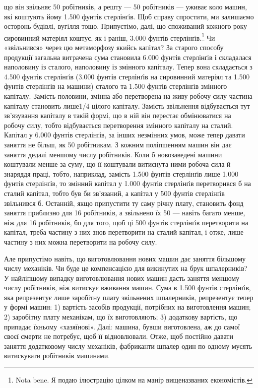 \parcont{}  %
що він звільняє 50 робітників, а решту — 50 робітників — уживає
коло машин, які коштують йому 1.500 фунтів стерлінґів. Щоб
справу спростити, ми залишаємо осторонь будівлі, вугілля тощо.
Припустімо, далі, що споживаний кожного року сировинний
матеріял коштує, як і раніш, 3.000 фунтів стерлінґів.\footnote{
Nota bene. Я подаю ілюстрацію цілком на манір вищеназваних
економістів.
} Чи
«звільнився» через цю метаморфозу якийсь капітал? За старого
способу продукції загальна витрачена сума становила 6.000 фунтів
стерлінґів і складалася наполовину із сталого, наполовину із
змінного капіталу. Тепер вона складається з 4.500 фунтів стерлінґів
(3.000 фунтів стерлінґів на сировинний матеріял та 1.500 фунтів
стерлінґів на машини) сталого та 1.500 фунтів стерлінґів змінного
капіталу. Замість половини, змінна або перетворена на живу робочу
силу частина капіталу становить лише1/4 цілого капіталу. Замість
звільнення відбувається тут зв’язування капіталу в такій формі,
що в ній він перестає обмінюватися на робочу силу, тобто відбувається
перетворення змінного капіталу на сталий. Капітал у 6.000
фунтів стерлінґів, за інших незмінних умов, може тепер давати заняття
не більш, як 50 робітникам. З кожним поліпшенням машин він
дає заняття дедалі меншому числу робітників. Коли б новозаведені
машини коштували менше за суму, що її коштували витиснута
ними робоча сила й знаряддя праці, тобто, наприклад, замість
1.500 фунтів стерлінґів лише 1.000 фунтів стерлінґів, то змінний
капітал у 1.000 фунтів стерлінґів перетворився б на сталий капітал,
тобто був би зв’язаний, а капітал у 500 фунтів стерлінґів
звільнився б. Останній, якщо припустити ту саму річну плату,
становить фонд заняття приблизно для 16 робітників, а звільнено
їх 50 — навіть багато менше, ніж для 16 робітників, бо для того,
щоб ці 500 фунтів стерлінґів перетворити на капітал, треба частину
з них знов перетворити на сталий капітал, і отже, лише частину
з них можна перетворити на робочу силу.

Але припустімо навіть, що виготовлювання нових машин дає
заняття більшому числу механіків. Чи буде це компенсацією
для викинутих на брук шпалерників? У найліпшому випадку
виготовлювання нових машин дасть заняття меншому числу
робітників, ніж витискує вживання машин. Сума в 1.500 фунтів
стерлінґів, яка репрезентує лише заробітну плату звільнених
шпалерників, репрезентує тепер у формі машин: 1) вартість засобів
продукції, потрібних на виготовлення машин; 2) заробітну
плату механікам, що їх виготовляють; 3) додаткову вартість, що
припадає їхньому «хазяїнові». Далі: машина, бувши виготовлена,
аж до самої своєї смерти не потребує, щоб її відновлювали. Отже,
щоб постійно давати заняття додатковому числу механіків, фабриканти
шпалер один по одному мусять витискувати робітників
машинами.

